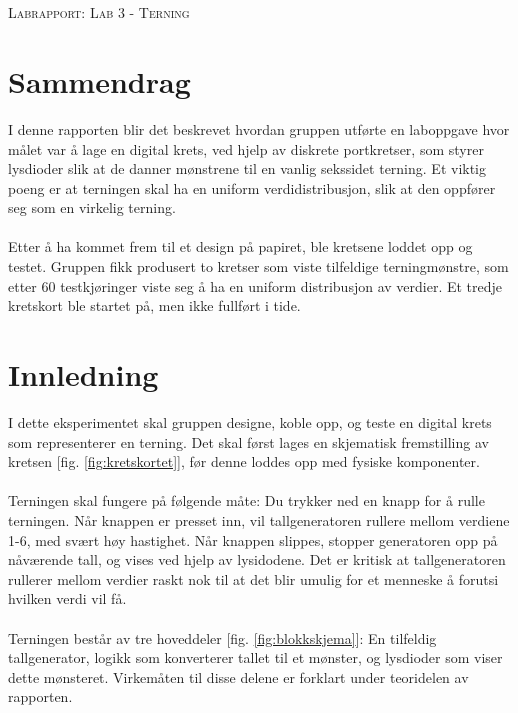 \documentclass[12pt,norsk,a4paper]{article}
\begin{document}

\clearpage



\section*{} %
\thispagestyle{empty}   
\begin{center}
\Large \textsc{Labrapport: Lab 3 - Terning}
\end{center}
\clearpage

\section*{Sammendrag}
\thispagestyle{empty}  

I denne rapporten blir det beskrevet hvordan gruppen utførte en laboppgave hvor målet var å lage en digital krets, ved hjelp av diskrete portkretser, som styrer lysdioder slik at de danner mønstrene til en vanlig sekssidet terning. Et viktig poeng er at terningen skal ha en uniform verdidistribusjon, slik at den oppfører seg som en virkelig terning.\\
\\
Etter å ha kommet frem til et design på papiret, ble kretsene loddet opp og testet. Gruppen fikk produsert to kretser som viste tilfeldige terningmønstre, som etter 60 testkjøringer viste seg å ha en uniform distribusjon av verdier. Et tredje kretskort ble startet på, men ikke fullført i tide.
\clearpage

\tableofcontents %
\thispagestyle{empty}   
\clearpage

\section{Innledning} 
\setcounter{page}{1}
I dette eksperimentet skal gruppen designe, koble opp, og teste en digital krets som representerer en terning. Det skal først lages en skjematisk fremstilling av kretsen [fig. \ref{fig:kretskortet}], før denne loddes opp med fysiske komponenter. \\
\\
Terningen skal fungere på følgende måte: Du trykker ned en knapp for å rulle terningen. Når knappen er presset inn, vil tallgeneratoren rullere mellom verdiene 1-6, med svært høy hastighet. Når knappen slippes, stopper generatoren opp på nåværende tall, og vises ved hjelp av lysidodene. Det er kritisk at tallgeneratoren rullerer mellom verdier raskt nok til at det blir umulig for et menneske å forutsi hvilken verdi vil få.\\
\\
Terningen består av tre hoveddeler [fig. \ref{fig:blokkskjema}]: En tilfeldig tallgenerator, logikk som konverterer tallet til et mønster, og lysdioder som viser dette mønsteret. Virkemåten til disse delene er forklart under teoridelen av rapporten.
\end{document}
